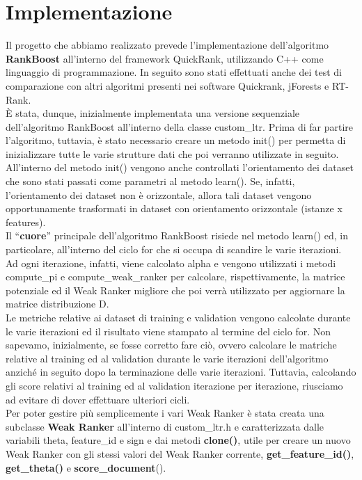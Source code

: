 \chapter*{Implementazione}

Il progetto che abbiamo realizzato prevede l'implementazione dell'algoritmo \textbf{RankBoost} all'interno del framework QuickRank, utilizzando C++ come linguaggio di programmazione. In seguito sono stati effettuati anche dei test di comparazione con altri algoritmi presenti nei software Quickrank, jForests e RT-Rank.\\
È stata, dunque, inizialmente implementata una versione sequenziale dell'algoritmo RankBoost all'interno della classe custom\_ltr. Prima di far partire l'algoritmo, tuttavia, è stato necessario creare un metodo init() per permetta di inizializzare tutte le varie strutture dati che poi verranno utilizzate in seguito. All'interno del metodo init() vengono anche controllati l'orientamento dei dataset che sono stati passati come parametri al metodo learn(). Se, infatti, l'orientamento dei dataset non è orizzontale, allora tali dataset vengono opportunamente trasformati in dataset con orientamento orizzontale (istanze x features).\\
Il ``\textbf{cuore}'' principale dell'algoritmo RankBoost risiede nel metodo learn() ed, in particolare, all'interno del ciclo for che si occupa di scandire le varie iterazioni. Ad ogni iterazione, infatti, viene calcolato alpha e vengono utilizzati i metodi compute\_pi e compute\_weak\_ranker per calcolare, rispettivamente, la matrice potenziale ed il Weak Ranker migliore che poi verrà utilizzato per aggiornare la matrice distribuzione D.\\
Le metriche relative ai dataset di training e validation vengono calcolate durante le varie iterazioni ed il risultato viene stampato al termine del ciclo for. Non sapevamo, inizialmente, se fosse corretto fare ciò, ovvero calcolare le matriche relative al training ed al validation durante le varie iterazioni dell'algoritmo anziché in seguito dopo la terminazione delle varie iterazioni. Tuttavia, calcolando gli score relativi al training ed al validation iterazione per iterazione, riusciamo ad evitare di dover effettuare ulteriori cicli.\\
Per poter gestire più semplicemente i vari Weak Ranker è stata creata una subclasse \textbf{Weak Ranker} all'interno di custom\_ltr.h e caratterizzata dalle variabili theta, feature\_id e sign e dai metodi \textbf{clone()}, utile per creare un nuovo Weak Ranker con gli stessi valori del Weak Ranker corrente, \textbf{get\_feature\_id()}, \textbf{get\_theta()} e \textbf{score\_document}().\\

